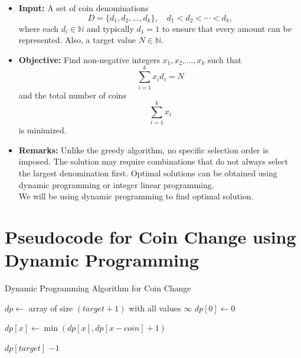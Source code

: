 \documentclass[12pt,a4paper]{report}
\begin{document}
\begin{itemize}
    \item \textbf{Input:} 
    A set of coin denominations
    \[
        D = \{d_1, d_2, \dots, d_k\}, \quad d_1 < d_2 < \cdots < d_k,
    \]
    where each $d_i \in \mathbb{N}$ and typically $d_1 = 1$ to ensure that every amount can be represented. 
    Also, a target value $N \in \mathbb{N}$.

    \item \textbf{Objective:} 
    Find non-negative integers $x_1, x_2, \dots, x_k$ such that
    \[
        \sum_{i=1}^{k} x_i d_i = N
    \]
    and the total number of coins
    \[
        \sum_{i=1}^{k} x_i
    \]
    is minimized.

    \item \textbf{Remarks:} 
    Unlike the greedy algorithm, no specific selection order is imposed. The solution may require combinations that do not always select the largest denomination first. Optimal solutions can be obtained using dynamic programming or integer linear programming.\\
    We will be using dynamic programming to find optimal solution.
\end{itemize}

\newpage

\section{Pseudocode for Coin Change using Dynamic Programming}
\begin{algorithm}
\caption{Dynamic Programming Algorithm for Coin Change}
\begin{algorithmic}[1]
    \State $dp \gets$ array of size $(target + 1)$ with all values $\infty$ 
    \State {}
    \State $dp[0] \gets 0$ 

                \State $dp[x] \gets \min(dp[x], dp[x - coin] + 1)$ 
            \EndIf
        \EndFor
    \EndFor

        \State \Return $dp[target]$ 
    \Else
        \State \Return $-1$ 
    \EndIf
\EndProcedure
\end{algorithmic}
\end{algorithm}
\end{document}
